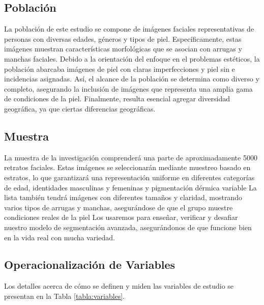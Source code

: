 \subsection{Población}
La población de este estudio se compone de imágenes faciales representativas de personas con diversas edades, géneros y tipos de piel. Específicamente, estas imágenes muestran características morfológicas que se asocian con arrugas y manchas faciales. Debido a la orientación del enfoque en el problemas estéticos, la población abarcaba imágenes de piel con claras imperfecciones y piel sin e incidencias asignadas. Así, el alcance de la población se determina como diverso y completo, asegurando la inclusión de imágenes que representa una amplia gama de condiciones de la piel. Finalmente, resulta esencial agregar diversidad geográfica, ya que ciertas diferencias geográficas.
\subsection{Muestra}
La muestra de la investigación comprenderá una parte de aproximadamente 5000 retratos faciales. Estas imágenes se seleccionarán mediante muestreo basado en estratos, lo que garantizará una representación uniforme en diferentes categorías de edad, identidades masculinas y femeninas y pigmentación dérmica variable La lista también tendrá imágenes con diferentes tamaños y claridad, mostrando varios tipos de arrugas y manchas, asegurándose de que el grupo muestre condiciones reales de la piel Los usaremos para enseñar, verificar y desafiar nuestro modelo de segmentación avanzada, asegurándonos de que funcione bien en la vida real con mucha variedad.

\subsection{Operacionalización de Variables}
Los detalles acerca de cómo se definen y miden las variables de estudio se presentan en la Tabla \ref{tabla:variables}.

